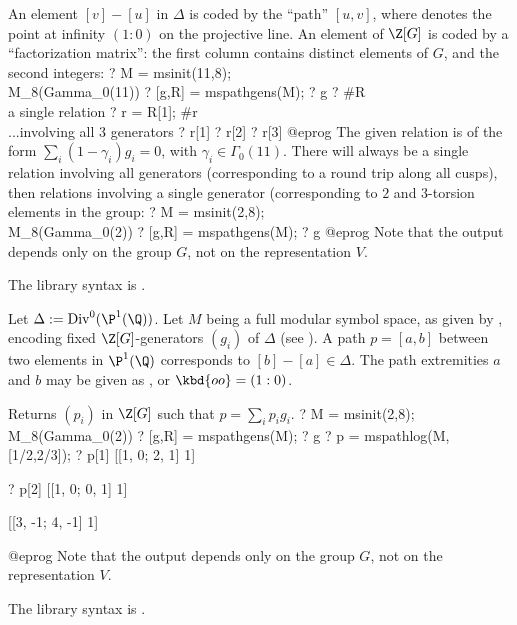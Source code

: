 An element $[v]-[u]$ in $\Delta$ is coded by the ``path'' $[u,v]$,
where  denotes the point at infinity $(1:0)$ on the projective
line.
An element of $\Z[G]$ is coded by a ``factorization matrix'': the first
column contains distinct elements of $G$, and the second integers:
\bprog
? M = msinit(11,8); \\ M_8(Gamma_0(11))
? [g,R] = mspathgens(M);
? g
? #R  \\ a single relation
? r = R[1]; #r \\ ...involving all 3 generators
? r[1]
? r[2]
? r[3]
@eprog\noindent
The given relation is of the form $\sum_i (1-\gamma_i) g_i = 0$, with
$\gamma_i\in \Gamma_0(11)$. There will always be a single relation involving
all generators (corresponding to a round trip along all cusps), then
relations involving a single generator (corresponding to $2$ and $3$-torsion
elements in the group:
\bprog
? M = msinit(2,8); \\ M_8(Gamma_0(2))
? [g,R] = mspathgens(M);
? g
@eprog\noindent
Note that the output depends only on the group $G$, not on the
representation $V$.

The library syntax is .

\label{se:mspathlog}
Let $\Delta:=\text{Div}^0(\P^1(\Q))$.
Let $M$ being a full modular symbol space, as given by ,
encoding fixed $\Z[G]$-generators $(g_i)$ of $\Delta$ (see ).
A path $p=[a,b]$ between two elements in $\P^1(\Q)$ corresponds to
$[b]-[a]\in \Delta$. The path extremities $a$ and $b$ may be given as
,  or $\kbd{oo} = (1:0)$.

Returns $(p_i)$ in $\Z[G]$ such that $p = \sum_i p_i g_i$.
\bprog
? M = msinit(2,8); \\ M_8(Gamma_0(2))
? [g,R] = mspathgens(M);
? g
? p = mspathlog(M, [1/2,2/3]);
? p[1]
[[1, 0; 2, 1] 1]

? p[2]
[[1, 0; 0, 1] 1]

[[3, -1; 4, -1] 1]

@eprog\noindent
Note that the output depends only on the group $G$, not on the
representation $V$.

The library syntax is .

